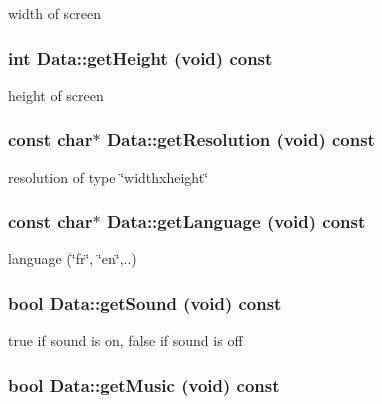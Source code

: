 width of screen 
\subsubsection{\setlength{\rightskip}{0pt plus 5cm}int Data::getHeight (void) const\hspace{0.3cm}{\tt  [inline]}}\label{classData_26a94cc923971d4af5fdaa33c8202b31}


height of screen 
\subsubsection{\setlength{\rightskip}{0pt plus 5cm}const char$\ast$ Data::getResolution (void) const\hspace{0.3cm}{\tt  [inline]}}\label{classData_8c2685ee4b1d3a0f478a9c36b77ae6cb}


resolution of type \char`\"{}widthxheight\char`\"{} 
\subsubsection{\setlength{\rightskip}{0pt plus 5cm}const char$\ast$ Data::getLanguage (void) const\hspace{0.3cm}{\tt  [inline]}}\label{classData_e8352ffb87b12000ffdadcb138439b32}


language (\char`\"{}fr\char`\"{}, \char`\"{}en\char`\"{},..) 
\subsubsection{\setlength{\rightskip}{0pt plus 5cm}bool Data::getSound (void) const\hspace{0.3cm}{\tt  [inline]}}\label{classData_8e4a4fcd24d72ff76ee4fe64c9e96e7f}


true if sound is on, false if sound is off 
\subsubsection{\setlength{\rightskip}{0pt plus 5cm}bool Data::getMusic (void) const\hspace{0.3cm}{\tt  [inline]}}\label{classData_8c6b482b7456abbff4c55435a764d211}


